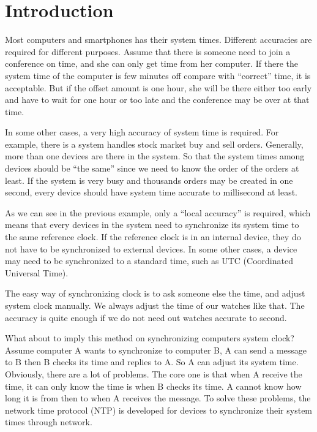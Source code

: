 

\chapter{Introduction}
Most computers and smartphones has their system times. Different accuracies are
required for different purposes. 
Assume that there is someone need to join a conference on time, and she can
only get time from her computer. If there the system time of the computer is
few minutes off compare with ``correct'' time, it is acceptable. But if the
offset amount is one hour, she will be there either too early and have to
wait for one hour or too late and the conference may be over at that time.

In some other cases, a very high accuracy of system time is required. For
example, there is a system handles stock market buy and sell orders. Generally,
more than one devices are there in the system. So that the system times among
devices should be ``the same'' since we need to know the order of the orders at
least. If the system is very busy and thousands orders may be created in one
second, every device should have system time accurate to millisecond at least.

As we can see in the previous example, only a ``local accuracy'' is required,
which means that every devices in the system need to synchronize its system
time to the same reference clock. If the reference clock is in an internal
device, they do not have to be synchronized to external devices. In some other
cases, a device may need to be synchronized to a standard time, such as UTC
(Coordinated Universal Time).  

The easy way of synchronizing clock is to ask someone else the time, and
adjust system clock manually. We always adjust the time of our
watches like that. The accuracy is quite enough if we do not need out watches
accurate to second. 

What about to imply this method on synchronizing computers system clock? Assume
computer A wants to synchronize to computer B, A can send a message to B then B
checks its time and replies to A. So A can adjust its system time.  
Obviously, there are a lot of problems.  The core one is that when A receive
the time, it can only know the time is when B checks its time. A cannot know
how long it is from then to when A receives the message. To solve these
problems, the network time protocol (NTP) is developed for devices to
synchronize their system times through network. 
